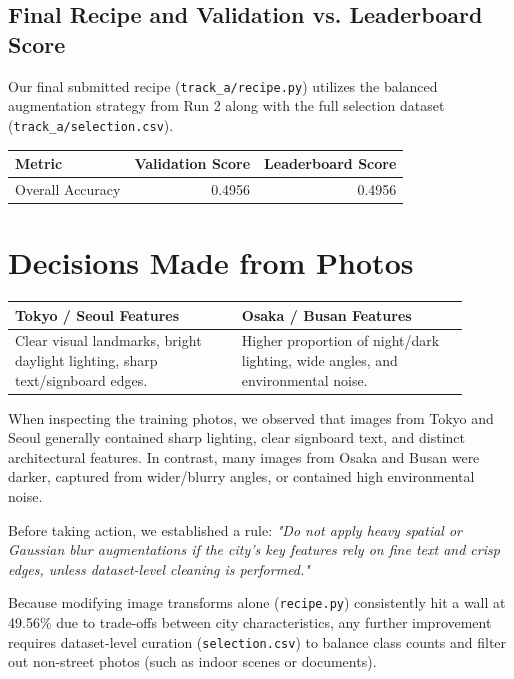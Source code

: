 \documentclass[11pt]{article}
\begin{document}
\subsection*{Final Recipe and Validation vs. Leaderboard Score}

Our final submitted recipe (\texttt{track\_a/recipe.py}) utilizes the balanced augmentation strategy from Run 2 along with the full selection dataset (\texttt{track\_a/selection.csv}).

\begin{center}
\begin{tabular}{lrr}
\toprule
Metric & Validation Score & Leaderboard Score \\
\midrule
Overall Accuracy & 0.4956 & 0.4956 \\
\bottomrule
\end{tabular}
\end{center}

\section*{Decisions Made from Photos}

\begin{center}
\small
\begin{tabular}{p{0.45\linewidth}p{0.45\linewidth}}
\toprule
\textbf{Tokyo / Seoul Features} & \textbf{Osaka / Busan Features} \\
\midrule
Clear visual landmarks, bright daylight lighting, sharp text/signboard edges. & Higher proportion of night/dark lighting, wide angles, and environmental noise. \\
\bottomrule
\end{tabular}
\end{center}

When inspecting the training photos, we observed that images from Tokyo and Seoul generally contained sharp lighting, clear signboard text, and distinct architectural features. In contrast, many images from Osaka and Busan were darker, captured from wider/blurry angles, or contained high environmental noise.

Before taking action, we established a rule: \textit{"Do not apply heavy spatial or Gaussian blur augmentations if the city's key features rely on fine text and crisp edges, unless dataset-level cleaning is performed."}

Because modifying image transforms alone (\texttt{recipe.py}) consistently hit a wall at 49.56\% due to trade-offs between city characteristics, any further improvement requires dataset-level curation (\texttt{selection.csv}) to balance class counts and filter out non-street photos (such as indoor scenes or documents).
\end{document}
